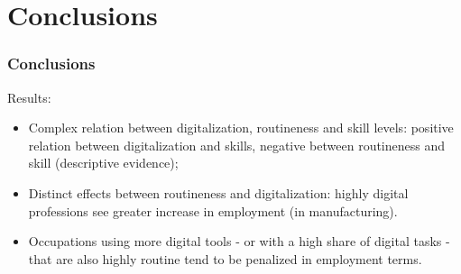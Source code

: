 \documentclass[10pt,xcolor={usenames,dvipsnames}]{beamer}
\begin{document}
\section{Conclusions}
\begin{frame} 
\frametitle{Conclusions}


\smallskip

Results:

\begin{itemize}
    \item Complex relation between digitalization, routineness and skill levels: positive relation between digitalization and skills, negative between routineness and skill (descriptive evidence);
    \item Distinct effects between routineness and digitalization: highly digital professions see greater increase in employment (in manufacturing).
    \item Occupations using more digital tools - or with a high share of digital tasks - that are also highly routine tend to be penalized in employment terms.
\end{itemize}
\end{frame}



\lastframe
\end{document}
